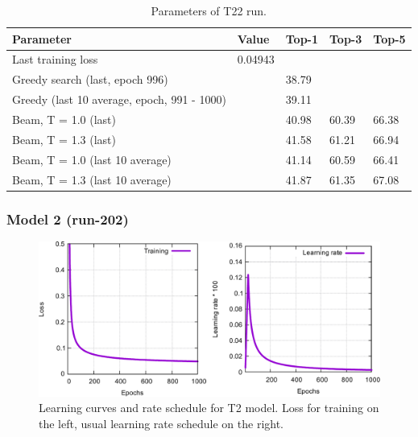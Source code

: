 \documentclass{article}
\begin{document}
\begin{table}[h!]
\caption{Parameters of T22 run.}
  \centering
  \begin{tabular}{p{8.2cm}p{1.5cm}p{1.5cm}p{1.5cm}p{1.5cm}}
    \toprule
    Parameter & Value & Top-1 & Top-3 & Top-5 \\
    \midrule
    Last training loss & 0.04943 & & & \\
    \midrule
    Greedy search (last, epoch 996) & & 38.79 & & \\
    Greedy (last 10 average, epoch, 991 - 1000) & & 39.11 & & \\
    \midrule
    Beam, T = 1.0 (last) & & 40.98 & 60.39 & 66.38  \\
    Beam, T = 1.3 (last) & & 41.58 &  61.21 & 66.94 \\ 
    \midrule
    Beam, T = 1.0 (last 10 average) & & 41.14  & 60.59 &  66.41\\
    Beam, T = 1.3 (last 10 average) & &  41.87 &  61.35 &  67.08\\ 
    \bottomrule
  \end{tabular}
  \label{tbl:t11}

\end{table} 

\newpage
 \subsubsection{Model 2 (run-202)}
 
\begin{figure}[h!]
  \centering
  \includegraphics[width = 16.5cm]{images/t2-3.pdf}
  \caption{Learning curves and rate schedule for T2 model. Loss for training on the left, usual learning rate schedule on the right.}
  \label{fig:t21}
\end{figure}
\end{document}
